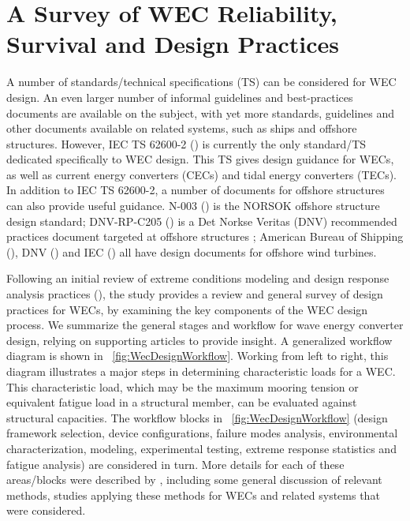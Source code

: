 \section{A Survey of WEC Reliability, Survival and Design Practices}
A number of standards/technical specifications (TS) can be considered for WEC design.
An even larger number of informal guidelines and best-practices documents are available on the subject, with yet more standards, guidelines and other documents available on related systems, such as ships and offshore structures.
However, IEC TS 62600-2 (\cite{IECTS62600-2}) is currently the only standard/TS dedicated specifically to WEC design.
This TS gives design guidance for WECs, as well as current energy converters (CECs) and tidal energy converters (TECs).
In addition to IEC TS 62600-2, a number of documents for offshore structures can also provide useful guidance.
N-003 (\cite{N-003}) is the NORSOK %
offshore structure design standard; DNV-RP-C205 (\cite{DNV-RP-C205}) is a Det Norkse Veritas (DNV) recommended practices document targeted at offshore structures ; American Bureau of Shipping (\cite{ABS2011}), DNV (\cite{DNV-OS-J101}) and IEC (\cite{IEC61400-3}) all have design documents for offshore wind turbines.

Following an initial review of extreme conditions modeling and design response analysis practices (\cite{Coe2014a}), the study provides a review and general survey of design practices for WECs, by examining the key components of the WEC design process.
We summarize the general stages and workflow for wave energy converter design, relying on supporting articles to provide insight.
A generalized workflow diagram is shown in \figurename~\ref{fig:WecDesignWorkflow}.
Working from left to right, this diagram illustrates a major steps in determining characteristic loads for a WEC.
This characteristic load, which may be the maximum mooring tension or equivalent fatigue load in a structural member, can be evaluated against structural capacities.
The workflow blocks in \figurename~\ref{fig:WecDesignWorkflow} (design framework selection, device configurations, failure modes analysis, environmental characterization, modeling, experimental testing, extreme response statistics and fatigue analysis) are considered in turn.
More details for each of these areas/blocks were described by \cite{Coe2017}, including some general discussion of relevant methods, studies applying these methods for WECs and related systems that were considered.

